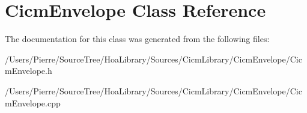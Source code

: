 \hypertarget{class_cicm_envelope}{\section{Cicm\-Envelope Class Reference}
\label{class_cicm_envelope}
}


The documentation for this class was generated from the following files\-:\begin{DoxyCompactItemize}
\item 
/\-Users/\-Pierre/\-Source\-Tree/\-Hoa\-Library/\-Sources/\-Cicm\-Library/\-Cicm\-Envelope/Cicm\-Envelope.\-h\item 
/\-Users/\-Pierre/\-Source\-Tree/\-Hoa\-Library/\-Sources/\-Cicm\-Library/\-Cicm\-Envelope/Cicm\-Envelope.\-cpp\end{DoxyCompactItemize}
